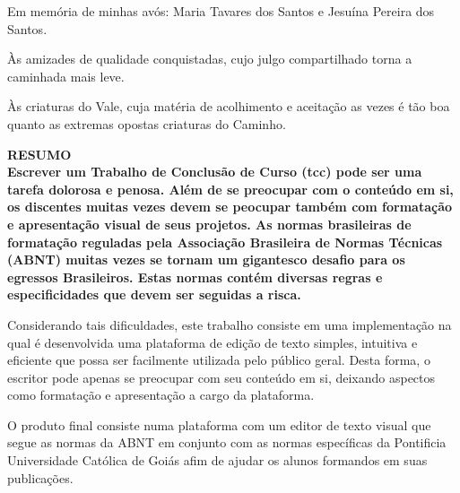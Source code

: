 \documentclass[12pt,a4paper,oneside,brazil]{abntex2}
\begin{document}
Em memória de minhas avós: Maria Tavares dos Santos e
Jesuína Pereira dos Santos.

\vspace{10mm}

Às amizades de qualidade conquistadas, cujo julgo compartilhado
torna a caminhada mais leve.

\vspace{30mm}


Às criaturas do Vale, cuja matéria de acolhimento e aceitação
as vezes é tão boa quanto as extremas opostas criaturas do Caminho.



\clearpage



\centering
\ABNTEXchapterfont\bfseries{\textsc{\MakeUppercase{Resumo}}}\\
\vspace*{3cm}
\justifying
\normalfont
Escrever um Trabalho de Conclusão de Curso (\acrshort{tcc}) pode ser uma tarefa dolorosa e penosa.
Além de se preocupar com o conteúdo em si, os discentes muitas vezes devem se peocupar também com formatação e
apresentação visual de seus projetos. As normas brasileiras de formatação reguladas pela Associação Brasileira de Normas Técnicas
(ABNT) muitas vezes se tornam um gigantesco desafio para os egressos Brasileiros. Estas normas contém diversas regras
e especificidades que devem ser seguidas a risca.

Considerando tais dificuldades, este trabalho consiste em uma implementação na qual é desenvolvida uma plataforma de edição de texto
simples, intuitiva e eficiente que possa ser facilmente utilizada pelo público geral.
Desta forma, o escritor pode apenas se preocupar com seu conteúdo em si, deixando aspectos como formatação e apresentação
a cargo da plataforma.

O produto final consiste numa plataforma com um editor de texto visual que segue as normas da ABNT em conjunto com as
normas específicas da Pontificia Universidade Católica de Goiás afim de ajudar os alunos formandos em suas publicações.
\clearpage
\end{document}
